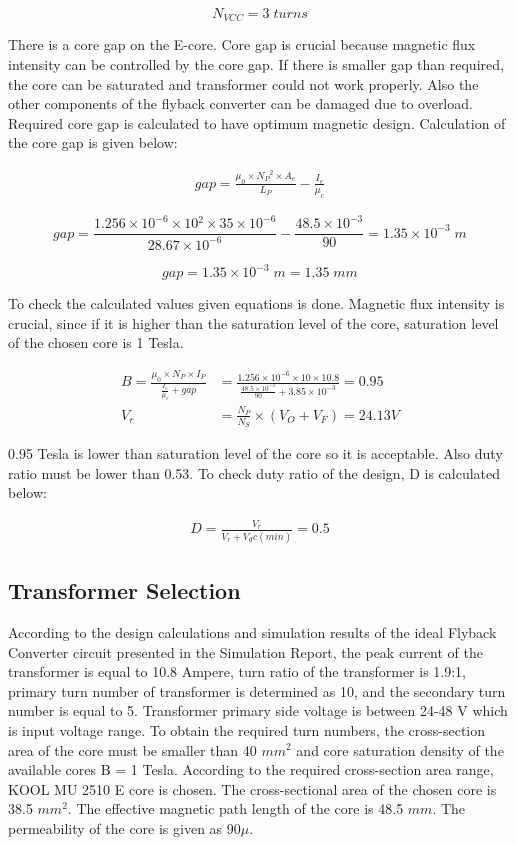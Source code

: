 $$ N_{VCC}= 3\;turns $$

There is a core gap on the E-core. Core gap is crucial because magnetic flux intensity can be controlled by the core gap. If there is smaller gap than required, the core can be saturated and transformer could not work properly. Also the other components of the flyback converter can be damaged due to overload. Required core gap is calculated to have optimum magnetic design. Calculation of the core gap is given below:

\begin{align}
    gap=\frac{\mu_0\times N_P{^2}\times A_e }{L_P}-\frac{I_e}{\mu_c}
    \label{eqn:gap}
\end{align}

$$ gap = \frac{1.256\times 10^{-6}\times 10{^2}\times 35\times 10^{-6}}{28.67\times 10^{-6}}-\frac{48.5\times 10^{-3}}{90}=1.35\times 10^{-3}\;m $$

$$ gap = 1.35\times 10^{-3}\;m = 1.35\;mm $$

To check the calculated values given equations is done. Magnetic flux intensity is crucial, since if it is higher than the saturation level of the core, saturation level of the chosen core is 1 Tesla.

\begin{align}
    B=\frac{\mu_0\times N_P\times I_P}{\frac{I_e}{\mu_c}+gap}&=\frac{1.256\times 10^{-6}\times 10\times 10.8}{\frac{48.5\times 10^{-3}}{90}+3.85\times 10^{-3}}=0.95\\
    V_r&=\frac{N_P}{N_S}\times (V_O+V_F)=24.13 V
\end{align}

0.95 Tesla is lower than saturation level of the core so it is acceptable. Also duty ratio must be lower than 0.53. To check duty ratio of the design, D is calculated below:

\begin{align}
    D=\frac{V_r}{V_r+V{_dc(min)}}=0.5
\end{align}

\subsection{Transformer Selection}

According to the design calculations and simulation results of the ideal Flyback Converter circuit presented in the Simulation Report, the peak current of the transformer is equal to 10.8 Ampere, turn ratio of the transformer is 1.9:1, primary turn number of transformer is determined as 10, and the secondary turn number is equal to 5. Transformer primary side voltage is between 24-48 V which is input voltage range. To obtain the required turn numbers, the cross-section area of the core must be smaller than 40 $mm^2$ and core saturation density of the available cores B = 1 Tesla. According to the required cross-section area range, KOOL MU 2510 E core is chosen. The cross-sectional area of the chosen core is 38.5 $mm^2$. The effective magnetic path length of the core is 48.5 $mm$. The permeability of the core is given as 90$\mu$.

